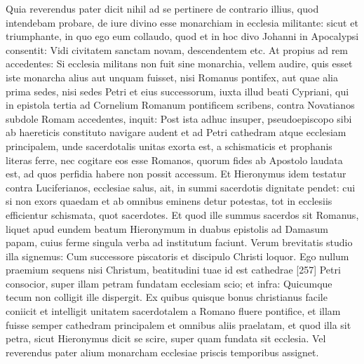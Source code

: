 Quia reverendus pater dicit nihil ad se pertinere de contrario illius, quod intendebam probare, de iure divino esse monarchiam in ecclesia militante: sicut et triumphante, in quo ego eum collaudo, quod et in hoc divo Johanni in Apocalypsi consentit: Vidi civitatem sanctam novam, descendentem etc. At propius ad rem accedentes: Si ecclesia militans non fuit sine monarchia, vellem audire, quis esset iste monarcha alius aut unquam fuisset, nisi Romanus pontifex, aut quae alia prima sedes, nisi sedes Petri et eius successorum, iuxta illud beati Cypriani, qui in epistola tertia ad Cornelium Romanum pontificem scribens, contra Novatianos subdole Romam accedentes, inquit: Post ista adhuc insuper, pseudoepiscopo sibi ab haereticis constituto navigare audent et ad Petri cathedram atque ecclesiam principalem, unde sacerdotalis unitas exorta est, a schismaticis et prophanis literas ferre, nec cogitare eos esse Romanos, quorum fides ab Apostolo laudata est, ad quos perfidia habere non possit accessum. Et Hieronymus idem testatur contra Luciferianos, ecclesiae salus, ait, in summi sacerdotis dignitate pendet: cui si non exors quaedam et ab omnibus eminens detur potestas, tot in ecclesiis efficientur schismata, quot sacerdotes. Et quod ille summus sacerdos sit Romanus, liquet apud eundem beatum Hieronymum in duabus epistolis ad Damasum papam, cuius ferme singula verba ad institutum faciunt. Verum brevitatis studio illa signemus: Cum successore piscatoris et discipulo Christi loquor. Ego nullum praemium sequens nisi Christum, beatitudini tuae id est cathedrae [257] Petri consocior, super illam petram fundatam ecclesiam scio; et infra: Quicumque tecum non colligit ille dispergit. Ex quibus quisque bonus christianus facile coniicit et intelligit unitatem sacerdotalem a Romano fluere pontifice, et illam fuisse semper cathedram principalem et omnibus aliis praelatam, et quod illa sit petra, sicut Hieronymus dicit se scire, super quam fundata sit ecclesia. Vel reverendus pater alium monarcham ecclesiae priscis temporibus assignet.

